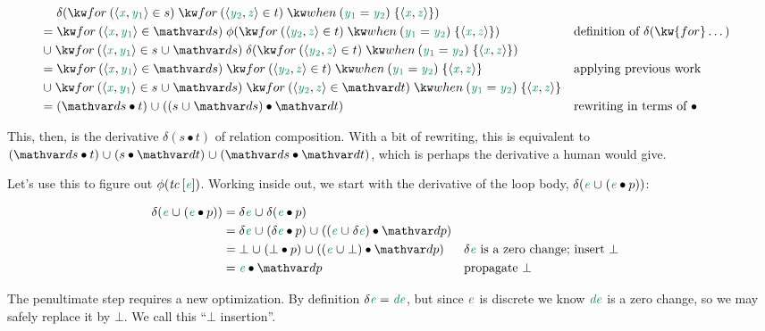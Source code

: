 \begin{align*}
  &\mathrel{\hphantom{=}}
  \delta(
  \eforraw{\etuple{\dvar x, \yone} \in s}
  \eforraw{\etuple{\ytwo, \dvar z} \in t}
  \ewhen{\yone = \ytwo} \esetraw{\etuple{\dvar x, \dvar z}})
  \\
  &= \eforraw{\etuple{\dvar x, \yone} \in \ds}
  \phi(\eforraw{\etuple{\ytwo, \dvar z} \in t}
  \ewhen{\yone = \ytwo} \esetraw{\etuple{\dvar x, \dvar z}})
  && \text{definition of $\delta(\kw{for} \dots)$}
  \\
  &\cup \eforraw{\etuple{\dvar x, \yone} \in s \cup \ds}
  \delta(\eforraw{\etuple{\ytwo, \dvar z} \in t}
  \ewhen{\yone = \ytwo} \esetraw{\etuple{\dvar x, \dvar z}})
  \\
  &= \eforraw{\etuple{\dvar x, \yone} \in \ds}
  \eforraw{\etuple{\ytwo, \dvar z} \in t}
  \ewhen{\yone = \ytwo} \esetraw{\etuple{\dvar x, \dvar z}}
  && \text{applying previous work}
  \\
  &\cup
  \eforraw{\etuple{\dvar x, \yone} \in s \cup \ds}
  \eforraw{\etuple{\ytwo, \dvar z} \in \dt}
  \ewhen{\yone = \ytwo} \esetraw{\etuple{\dvar x, \dvar z}}
  \\
  &= (\ds \bullet t) \cup ((s \cup \ds) \bullet \dt)
  && \text{rewriting in terms of ${\bullet}$}
\end{align*}

\noindent
This, then, is the derivative $\delta(s \bullet t)$ of relation composition.
With a bit of rewriting, this is equivalent to $(\ds \bullet t) \cup (s \bullet
\dt) \cup (\ds \bullet \dt)$, which is perhaps the derivative a human would
give.

Let's use this to figure out $\phi(\name{tc}\<\eboxvar{e})$. Working inside out,
we start with the derivative of the loop body, $\delta(\dvar e \cup (\dvar e
\bullet p))$:

\begin{align*}
  \delta({\dvar e \cup (\dvar e \bullet p)})
  &= \delta\dvar e \cup \delta(\dvar e \bullet p)\\
  &= \delta\dvar e
  \cup (\delta\dvar e \bullet p)
  \cup ((\dvar e \cup \delta\dvar e) \bullet \deep)
  \\
  &= \bot \cup (\bot \bullet p) \cup ((\dvar e \cup \bot) \bullet \deep)
  && \delta\dvar e ~\text{is a zero change; insert }\bot
  \\
  &= \dvar e \bullet \deep
  && \text{propagate}~\bot
\end{align*}

\noindent
The penultimate step requires a new optimization.
%
By definition $\delta\dvar e = \dvar{de}$, but since $\dvar e$ is discrete we
know $\dvar{de}$ is a zero change, so we may safely replace it by $\bot$.
%
We call this ``$\bot$ insertion''.

